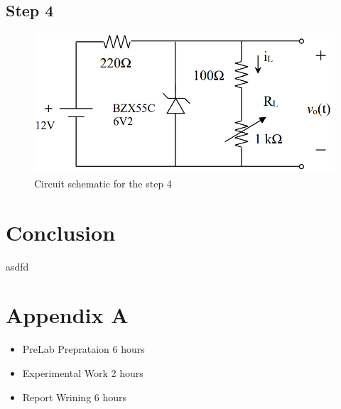 \documentclass[letterpaper,12pt]{article}
\begin{document}
    

\subsection{Step 4}

\begin{figure}[H]
    \centering
    \includegraphics[width=1\textwidth]{4_1.png}
    \caption{Circuit schematic for the step 4}
\end{figure} 
    
    
\section{Conclusion}
asdfd
\section*{Appendix A}
\begin{itemize}
    \item PreLab Preprataion 6 hours
    \item Experimental Work 2  hours
    \item Report Wrining 6 hours
\end{itemize}
\end{document}
